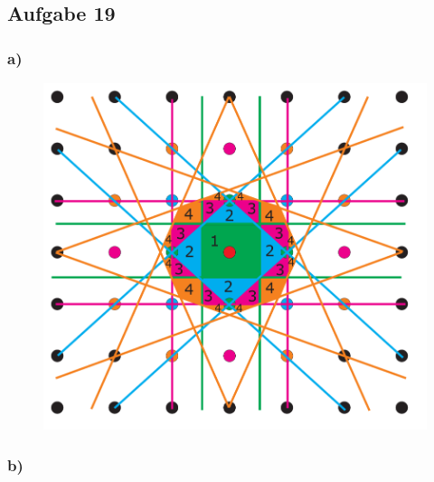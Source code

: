 \subsection*{Aufgabe 19}

\subsubsection*{a)}
\begin{figure}[!ht]
  \centering
  \includegraphics[width=16cm]{aufgabe19a.png}
\end{figure}

\subsubsection*{b)}

